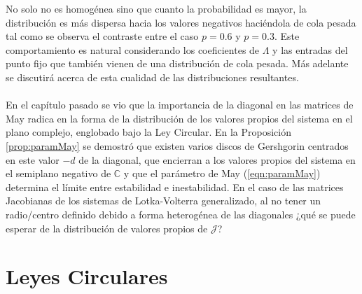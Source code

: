 No solo no es homogénea sino que cuanto la probabilidad es mayor, la distribución es más dispersa hacia los valores negativos haciéndola de cola pesada tal como se observa el contraste entre el caso $p=0.6$ y $p=0.3$. Este comportamiento es natural considerando los coeficientes de $\Lambda$ y las entradas del punto fijo que también vienen de una distribución de cola pesada. Más adelante se discutirá acerca de esta cualidad de las distribuciones resultantes.
\\
\\
En el capítulo pasado se vio que la importancia de la diagonal en las matrices de May radica en la forma de la distribución de los valores propios del sistema en el plano complejo, englobado bajo la Ley Circular. En la Proposición \ref{prop:paramMay} se demostró que existen varios discos de Gershgorin centrados en este valor $-d$ de la diagonal, que encierran a los valores propios del sistema en el semiplano negativo de $\mathbb{C}$ y que el parámetro de May (\ref{eqn:paramMay}) determina el límite entre estabilidad e inestabilidad. En el caso de las matrices Jacobianas de los sistemas de Lotka-Volterra generalizado, al no tener un radio/centro definido debido a forma heterogénea de las diagonales ¿qué se puede esperar de la distribución de valores propios de $\mathcal{J}$?
\newpage

\section{Leyes Circulares}

